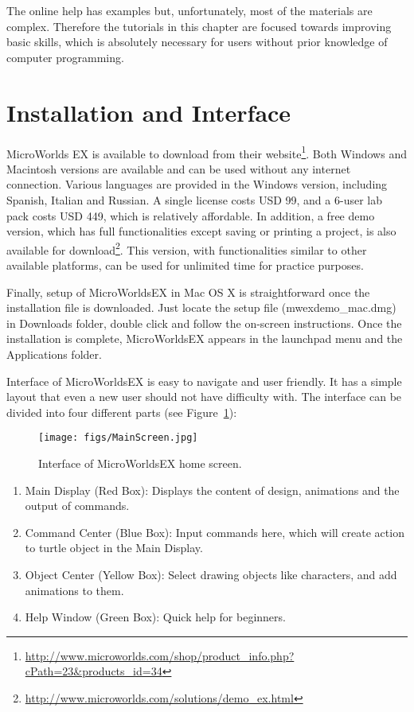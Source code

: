 The online help has examples but, unfortunately, most of the materials are complex. Therefore the tutorials in this chapter are focused towards improving basic skills, which is absolutely necessary for users without prior knowledge of computer programming.






\section{Installation and Interface}
MicroWorlds EX is available to download from their website\footnote{\url{http://www.microworlds.com/shop/product\_info.php?cPath=23\&products\_id=34}}. Both Windows and Macintosh versions are available and can be used without any internet connection. Various languages are provided in the Windows version, including Spanish, Italian and Russian. A single license costs USD 99, and a 6-user lab pack costs USD 449, which is relatively affordable. In addition, a free demo version, which has full functionalities except saving or printing a project, is also available for download\footnote{\url{http://www.microworlds.com/solutions/demo\_ex.html}}. This version, with functionalities similar to other available platforms, can be used for unlimited time for practice purposes.


Finally, setup of MicroWorldsEX in Mac OS X is straightforward once the installation file is downloaded. Just locate the setup file (mwexdemo\_mac.dmg) in Downloads folder, double click and follow the on-screen instructions. Once the installation is complete, MicroWorldsEX appears in the launchpad menu and the Applications folder. 

Interface of MicroWorldsEX is easy to navigate and user friendly. It has a simple layout that even a new user should not have difficulty with. The interface can be divided into four different parts (see Figure~\ref{fig:MainScreen}):

\begin{figure}
    \centering
    \texttt{[image: figs/MainScreen.jpg]}
    \caption{Interface of MicroWorldsEX home screen.}
\label{fig:MainScreen}
\end{figure}



\begin{enumerate}


\item Main Display (Red Box): Displays the content of design, animations and the output of commands.
\item Command Center (Blue Box): Input commands here, which will create action to turtle object in the Main Display.
\item Object Center (Yellow Box): Select drawing objects like characters, and add animations to them.
\item Help Window (Green Box): Quick help for beginners.

\end{enumerate}



